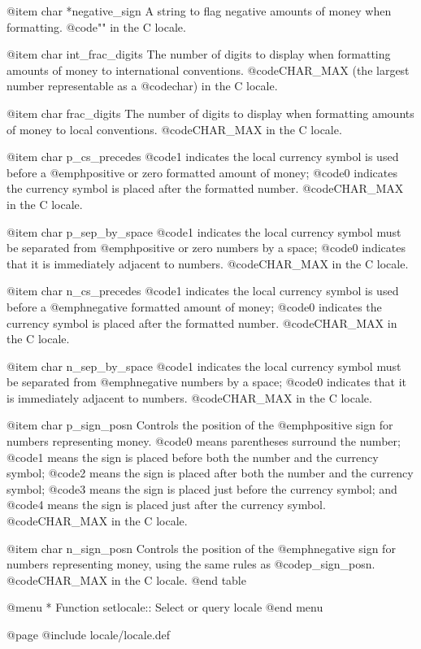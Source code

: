 @item char *negative_sign
A string to flag negative amounts of money when formatting.
@code{""} in the C locale.

@item char int_frac_digits
The number of digits to display when formatting amounts of money to
international conventions.
@code{CHAR_MAX} (the largest number representable as a @code{char}) in
the C locale. 

@item char frac_digits
The number of digits to display when formatting amounts of money to
local conventions.
@code{CHAR_MAX} in the C locale. 

@item char p_cs_precedes
@code{1} indicates the local currency symbol is used before a
@emph{positive or zero} formatted amount of money; @code{0} indicates
the currency symbol is placed after the formatted number.
@code{CHAR_MAX} in the C locale. 

@item char p_sep_by_space
@code{1} indicates the local currency symbol must be separated from
@emph{positive or zero} numbers by a space; @code{0} indicates that it
is immediately adjacent to numbers.
@code{CHAR_MAX} in the C locale. 

@item char n_cs_precedes
@code{1} indicates the local currency symbol is used before a
@emph{negative} formatted amount of money; @code{0} indicates
the currency symbol is placed after the formatted number.
@code{CHAR_MAX} in the C locale. 

@item char n_sep_by_space
@code{1} indicates the local currency symbol must be separated from
@emph{negative} numbers by a space; @code{0} indicates that it
is immediately adjacent to numbers.
@code{CHAR_MAX} in the C locale. 

@item char p_sign_posn
Controls the position of the @emph{positive} sign for
numbers representing money.  @code{0} means parentheses surround the
number; @code{1} means the sign is placed before both the number and the
currency symbol; @code{2} means the sign is placed after both the number
and the currency symbol; @code{3} means the sign is placed just before
the currency symbol; and @code{4} means the sign is placed just after
the currency symbol.
@code{CHAR_MAX} in the C locale. 

@item char n_sign_posn
Controls the position of the @emph{negative} sign for numbers
representing money, using the same rules as @code{p_sign_posn}.
@code{CHAR_MAX} in the C locale. 
@end table

@menu
* Function setlocale::  Select or query locale
@end menu

@page
@include locale/locale.def
